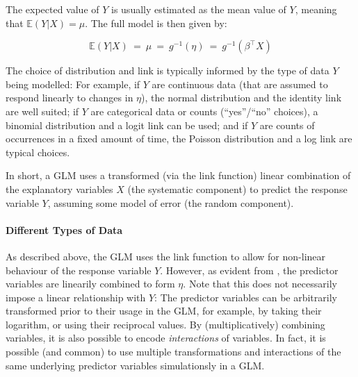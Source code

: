 The expected value of $Y$ is usually estimated as the mean value of $Y$, meaning that $\mathbb{E}(Y|X) = \mu$.
The full model is then given by:

\begin{equation}
    \label{ch:Factorization:sub:GLM:eq:GLM}
    \mathbb{E}(Y|X) ~=~ \mu ~=~ g^{-1}(\eta) ~=~ g^{-1}( \beta^\intercal X )
\end{equation}

The choice of distribution and link is typically informed by the type of data $Y$ being modelled:
For example, if $Y$ are continuous data (that are assumed to respond linearly to changes in $\eta$),
the normal distribution and the identity link are well suited;
if $Y$ are categorical data or counts (``yes''/``no'' choices), a binomial distribution and a logit link can be used;
and if $Y$ are counts of occurrences in a fixed amount of time, the Poisson distribution and a log link are typical choices.

In short, a \ac{GLM} uses a transformed (via the link function) linear combination of the explanatory variables $X$
(the systematic component) to predict the response variable $Y$, assuming some model of error (the random component).


\paragraph{Different Types of Data}
\label{ch:Factorization:sec:Methods:sub:GLMs:par:Data}

As described above, the \ac{GLM} uses the link function to allow for non-linear behaviour of the response variable $Y$.
However, as evident from ,
the predictor variables are linearily combined to form $\eta$.
Note that this does not necessarily impose a linear relationship with $Y$:
The predictor variables can be arbitrarily transformed prior to their usage in the \ac{GLM},
for example, by taking their logarithm, or using their reciprocal values.
By (multiplicatively) combining variables, it is also possible to encode \emph{interactions} of variables.
In fact, it is possible (and common) to use multiple transformations and interactions
of the same underlying predictor variables simulationsly in a \ac{GLM}.


